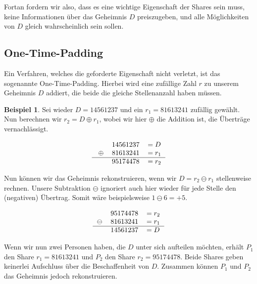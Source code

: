\documentclass[12pt, a4paper, oneside, titlepage]{report}
\theoremstyle{definition}
\newtheorem{bsp}[lemma]{Beispiel}
\begin{document}
		Fortan fordern wir also, dass es eine wichtige Eigenschaft der Shares sein muss, keine Informationen über das Geheimnis $ D $ preiszugeben, und alle Möglichkeiten von $ D $ gleich wahrscheinlich sein sollen.
		
	\subsection{One-Time-Padding}
		 Ein Verfahren, welches die geforderte Eigenschaft nicht verletzt, ist das sogenannte One-Time-Padding. Hierbei wird eine zufällige Zahl $ r $ zu unserem Geheimnis $ D $  addiert, die beide die gleiche Stellenanzahl haben müssen. %
	
	\begin{bsp}
		Sei wieder $ D = 14561237 $ und ein $ r_1 = 81613241 $ zufällig gewählt. Nun berechnen wir $ r_2 = D \oplus r_1 $, wobei wir hier $ \oplus $ die Addition ist, die Überträge vernachlässigt.
	
	\begin{equation}
		\begin{tabular}{crl}
		  &14561237&$ = D $\\\
		$\oplus$&81613241&$ = r_1 $\\\hline
		  &95174478&$ = r_2 $
		\end{tabular}
	\end{equation}
	
	Nun können wir das Geheimnis rekonstruieren, wenn wir $ D = r_2 \ominus r_1 $ stellenweise rechnen. Unsere Subtraktion $ \ominus $ ignoriert auch hier wieder für jede Stelle den (negativen) Übertrag. Somit wäre beispielsweise $ 1 \ominus 6 = + 5 $.
	
	\begin{equation}
	\begin{tabular}{crl}
	&95174478&$ = r_2 $\\
	$\ominus$&81613241&$ = r_1 $\\\hline
	&14561237&$ = D $
	\end{tabular}
	\end{equation}
	
	Wenn wir nun zwei Personen haben, die $ D $ unter sich aufteilen möchten, erhält $ P_1 $ den Share $ r_1 = 81613241 $ und $ P_2 $ den Share $ r_2 = 95174478$. Beide Shares geben keinerlei Aufschluss über die Beschaffenheit von $ D $. Zusammen können $ P_1 $ und $ P_2 $ das Geheimnis jedoch rekonstruieren.
	\end{bsp}
\end{document}
